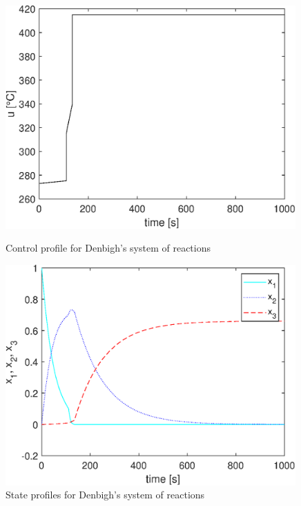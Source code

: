 \begin{figure}[htb]
	\begin{minipage}[t]{0.5\linewidth}
		\centering
		\includegraphics[width=0.99\textwidth]{examples/problem10/graphs/u_denbigh.eps}
		\caption[Denbigh's system of reactions: control profile]{Control profile for
			Denbigh's system of reactions}\label{fig:probdenbigh_u} 
	\end{minipage}
	\begin{minipage}[t]{0.5\linewidth}
		\centering
		\includegraphics[width=0.99\textwidth]{examples/problem10/graphs/x_denbigh.eps}
		\caption[Denbigh's system of reactions: state profiles]{State profiles for Denbigh's system of reactions}\label{fig:probdenbigh_x} 
	\end{minipage}
\end{figure}

  

